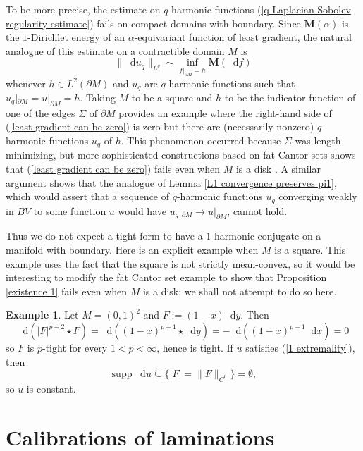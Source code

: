 \documentclass[reqno,11pt]{amsart}
\newcommand*\dif{\mathop{}\!\mathrm{d}}
\DeclareMathOperator{\supp}{supp}
\newcommand{\Mass}{\mathbf M}
\theoremstyle{definition}
\newtheorem{example}[theorem]{Example}
\numberwithin{equation}{section}
\begin{document}
To be more precise, the estimate on $q$-harmonic functions (\ref{q Laplacian Sobolev regularity estimate}) fails on compact domains with boundary.
Since $\Mass(\alpha)$ is the $1$-Dirichlet energy of an $\alpha$-equivariant function of least gradient, the natural analogue of this estimate on a contractible domain $M$ is
\begin{equation}\label{least gradient can be zero}
\|\dif u_q\|_{L^q} \sim \inf_{f|_{\partial M} = h} \Mass(\dif f)
\end{equation}
whenever $h \in L^2(\partial M)$ and $u_q$ are $q$-harmonic functions such that $u_q|_{\partial M} = u|_{\partial M} = h$.
Taking $M$ to be a square and $h$ to be the indicator function of one of the edges $\Sigma$ of $\partial M$ provides an example where the right-hand side of (\ref{least gradient can be zero}) is zero but there are (necessarily nonzero) $q$-harmonic functions $u_q$ of $h$.
This phenomenon occurred because $\Sigma$ was length-minimizing, but more sophisticated constructions based on fat Cantor sets shows that (\ref{least gradient can be zero}) fails even when $M$ is a disk \cite{Spradlin14}.
A similar argument shows that the analogue of Lemma \ref{L1 convergence preserves pi1}, which would assert that a sequence of $q$-harmonic functions $u_q$ converging weakly in $BV$ to some function $u$ would have $u_q|_{\partial M} \to u|_{\partial M}$, cannot hold.

Thus we do not expect a tight form to have a $1$-harmonic conjugate on a manifold with boundary.
Here is an explicit example when $M$ is a square.
This example uses the fact that the square is not strictly mean-convex, so it would be interesting to modify the fat Cantor set example to show that Proposition \ref{existence 1} fails even when $M$ is a disk; we shall not attempt to do so here.

\begin{example}
Let $M = (0, 1)^2$ and $F := (1 - x) \dif y$.
Then
$$\dif(|F|^{p - 2} \star F) = \dif((1 - x)^{p - 1} \star \dif y) = -\dif((1 - x)^{p - 1} \dif x) = 0$$
so $F$ is $p$-tight for every $1 < p < \infty$, hence is tight.
If $u$ satisfies (\ref{1 extremality}), then
$$\supp \dif u \subseteq \{|F| = \|F\|_{C^0}\} = \emptyset,$$
so $u$ is constant.
\end{example}

\section{Calibrations of laminations}\label{comass sec}
\end{document}

